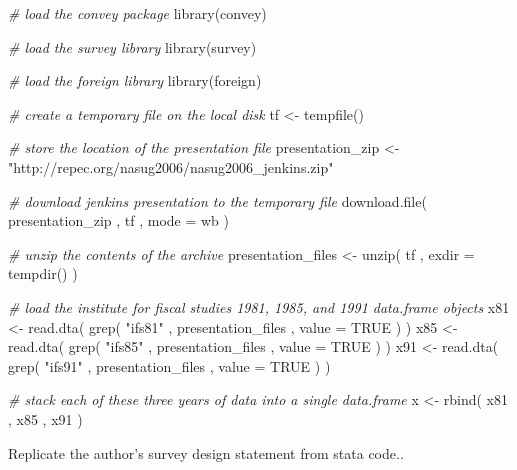 \documentclass[
]{book}
\newenvironment{Shaded}{\begin{snugshade}}{\end{snugshade}}
\newcommand{\AttributeTok}[1]{\textcolor[rgb]{0.77,0.63,0.00}{#1}}
\newcommand{\CommentTok}[1]{\textcolor[rgb]{0.56,0.35,0.01}{\textit{#1}}}
\newcommand{\ConstantTok}[1]{\textcolor[rgb]{0.00,0.00,0.00}{#1}}
\newcommand{\FunctionTok}[1]{\textcolor[rgb]{0.00,0.00,0.00}{#1}}
\newcommand{\NormalTok}[1]{#1}
\newcommand{\OtherTok}[1]{\textcolor[rgb]{0.56,0.35,0.01}{#1}}
\newcommand{\StringTok}[1]{\textcolor[rgb]{0.31,0.60,0.02}{#1}}
\begin{document}
\begin{Shaded}
\begin{Highlighting}[]
\CommentTok{\# load the convey package}
\FunctionTok{library}\NormalTok{(convey)}

\CommentTok{\# load the survey library}
\FunctionTok{library}\NormalTok{(survey)}

\CommentTok{\# load the foreign library}
\FunctionTok{library}\NormalTok{(foreign)}

\CommentTok{\# create a temporary file on the local disk}
\NormalTok{tf }\OtherTok{\textless{}{-}} \FunctionTok{tempfile}\NormalTok{()}

\CommentTok{\# store the location of the presentation file}
\NormalTok{presentation\_zip }\OtherTok{\textless{}{-}} \StringTok{"http://repec.org/nasug2006/nasug2006\_jenkins.zip"}

\CommentTok{\# download jenkins\textquotesingle{} presentation to the temporary file}
\FunctionTok{download.file}\NormalTok{( presentation\_zip , tf , }\AttributeTok{mode =} \StringTok{\textquotesingle{}wb\textquotesingle{}}\NormalTok{ )}

\CommentTok{\# unzip the contents of the archive}
\NormalTok{presentation\_files }\OtherTok{\textless{}{-}} \FunctionTok{unzip}\NormalTok{( tf , }\AttributeTok{exdir =} \FunctionTok{tempdir}\NormalTok{() )}

\CommentTok{\# load the institute for fiscal studies\textquotesingle{} 1981, 1985, and 1991 data.frame objects}
\NormalTok{x81 }\OtherTok{\textless{}{-}} \FunctionTok{read.dta}\NormalTok{( }\FunctionTok{grep}\NormalTok{( }\StringTok{"ifs81"}\NormalTok{ , presentation\_files , }\AttributeTok{value =} \ConstantTok{TRUE}\NormalTok{ ) )}
\NormalTok{x85 }\OtherTok{\textless{}{-}} \FunctionTok{read.dta}\NormalTok{( }\FunctionTok{grep}\NormalTok{( }\StringTok{"ifs85"}\NormalTok{ , presentation\_files , }\AttributeTok{value =} \ConstantTok{TRUE}\NormalTok{ ) )}
\NormalTok{x91 }\OtherTok{\textless{}{-}} \FunctionTok{read.dta}\NormalTok{( }\FunctionTok{grep}\NormalTok{( }\StringTok{"ifs91"}\NormalTok{ , presentation\_files , }\AttributeTok{value =} \ConstantTok{TRUE}\NormalTok{ ) )}

\CommentTok{\# stack each of these three years of data into a single data.frame}
\NormalTok{x }\OtherTok{\textless{}{-}} \FunctionTok{rbind}\NormalTok{( x81 , x85 , x91 )}
\end{Highlighting}
\end{Shaded}

Replicate the author's survey design statement from stata code..
\end{document}
